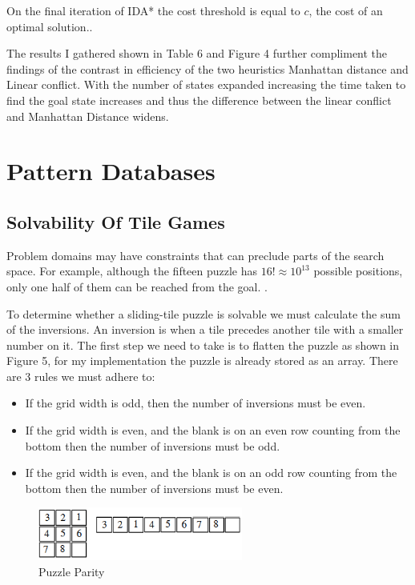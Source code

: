\documentclass[progress]{cmpreport}
\begin{document}
On the final iteration of IDA* the cost threshold is equal to $c$, the cost of an optimal solution.\citep{DBLP:journals/ai/KorfRE01}.

The results I gathered shown in Table 6 and Figure 4 further compliment the findings of the contrast in efficiency of the two heuristics Manhattan distance and Linear conflict. With the number of states expanded increasing the time taken to find the goal state increases and thus the difference between the linear conflict and Manhattan Distance widens.


\section{Pattern Databases}
\subsection{Solvability Of Tile Games}
Problem domains may have constraints that can preclude parts of the search space. For example, although the fifteen puzzle has $ 16! \approx 10^{13} $ possible positions, only one half of them can be reached from the goal. \citep{DBLP:journals/ci/CulbersonS98}. 

To determine whether a sliding-tile puzzle is solvable we must calculate the sum of the inversions.
An inversion is when a tile precedes another tile with a smaller number on it. The first step we need to take is to flatten the puzzle as shown in Figure 5, for my implementation the puzzle is already stored as an array.
There are 3 rules we must adhere to: \citep{WinNT}
\begin{itemize}
 	\item If the grid width is odd, then the number of inversions must be even.
	\item If the grid width is even, and the blank is on an even row counting from the bottom then the number of inversions must be odd.
	\item If the grid width is even, and the blank is on an odd row counting from the bottom then the number of inversions must be even. 
	
\end{itemize}




\begin{figure}[ht]
	\centering
	\includegraphics[width=0.6\textwidth]{parity}
	\captionsetup{justification=centering}
	\caption{Puzzle Parity}
\end{figure}
\end{document}
